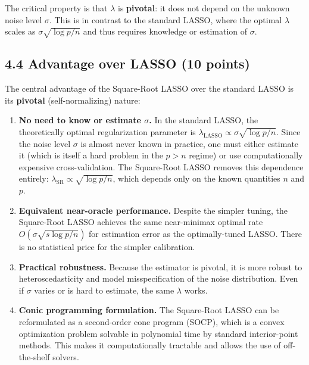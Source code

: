 \documentclass[11pt]{article}
\begin{document}
The critical property is that $\lambda$ is \textbf{pivotal}: it does not depend on the unknown noise level $\sigma$. This is in contrast to the standard LASSO, where the optimal $\lambda$ scales as $\sigma\sqrt{\log p/n}$ and thus requires knowledge or estimation of $\sigma$.

\subsection*{4.4 Advantage over LASSO (10 points)}

The central advantage of the Square-Root LASSO over the standard LASSO is its
\textbf{pivotal} (self-normalizing) nature:

\begin{enumerate}
    \item \textbf{No need to know or estimate $\sigma$.}
    In the standard LASSO, the theoretically optimal regularization parameter is
    $\lambda_{\text{LASSO}} \propto \sigma\sqrt{\log p/n}$.
    Since the noise level $\sigma$ is almost never known in practice, one must either
    estimate it (which is itself a hard problem in the $p > n$ regime) or use
    computationally expensive cross-validation. The Square-Root LASSO removes this
    dependence entirely: $\lambda_{\text{SR}} \propto \sqrt{\log p/n}$, which depends only
    on the known quantities $n$ and $p$.

    \item \textbf{Equivalent near-oracle performance.}
    Despite the simpler tuning, the Square-Root LASSO achieves the same near-minimax
    optimal rate $O(\sigma\sqrt{s\log p/n})$ for estimation error as the optimally-tuned LASSO.
    There is no statistical price for the simpler calibration.

    \item \textbf{Practical robustness.}
    Because the estimator is pivotal, it is more robust to heteroscedasticity and
    model misspecification of the noise distribution. Even if $\sigma$ varies or is
    hard to estimate, the same $\lambda$ works.

    \item \textbf{Conic programming formulation.}
    The Square-Root LASSO can be reformulated as a second-order cone program (SOCP),
    which is a convex optimization problem solvable in polynomial time by standard
    interior-point methods. This makes it computationally tractable and allows the use
    of off-the-shelf solvers.
\end{enumerate}
\end{document}
